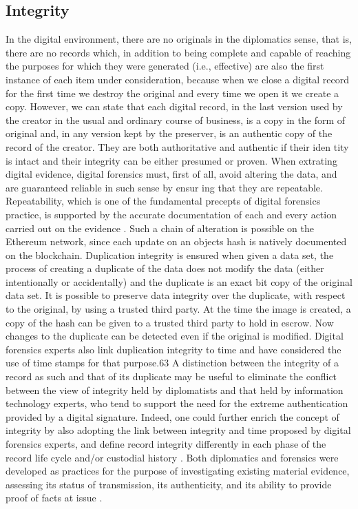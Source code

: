 \subsection{Integrity}
In the digital environment, there are no originals in the diplomatics sense, that is, there are no records which, in addition to being complete and capable of reaching the purposes for which they were generated (i.e., effective) are also the first instance of each item under consideration, because when we close a digital record for the first time we destroy the original and every time we open it we create a copy. However, we can state that each digital record, in the last version used by the creator in the usual and ordinary course of business, is a copy in the form of original and, in any version kept by the preserver, is an authentic copy of the record of the creator. They are both authoritative and authentic if their iden tity is intact and their integrity can be either presumed or proven. When extrating digital evidence, digital forensics must, first of all, avoid altering the data, and are guaranteed reliable in such sense by ensur ing that they are repeatable. Repeatability, which is one of the fundamental precepts of digital forensics practice, is supported by the accurate documentation of each and every action carried out on the evidence \cite[58]{duranti2009digital}. Such a chain of alteration is possible on the Ethereum network, since each update on an objects hash is natively documented on the blockchain.
Duplication integrity is ensured when given a data set, the process of creating a duplicate of the data does not modify the data (either intentionally or accidentally) and the duplicate is an exact bit copy of the original data set. It is possible to preserve data integrity over the duplicate, with respect to the original, by using a trusted third party. At the time the image is created, a copy of the hash can be given to a trusted third party to hold in escrow. Now changes to the duplicate can be detected even if the original is modified.
Digital forensics experts also link duplication integrity to time and have considered the use of time stamps for that purpose.63 A distinction between the integrity of a record as such and that of its duplicate may be useful to eliminate the conflict between the view of integrity held by diplomatists and that held by information technology experts, who tend to support the need for the extreme authentication provided by a digital signature. Indeed, one could further enrich the concept of integrity by also adopting the link between integrity and time proposed by digital forensics experts, and define record integrity differently in each phase of the record life cycle and/or custodial history \cite[60]{duranti2009digital}.
Both diplomatics and forensics were developed as practices for the purpose of investigating existing material evidence, assessing its status of transmission, its authenticity, and its ability to provide proof of facts at issue \cite[64]{duranti2009digital}.

